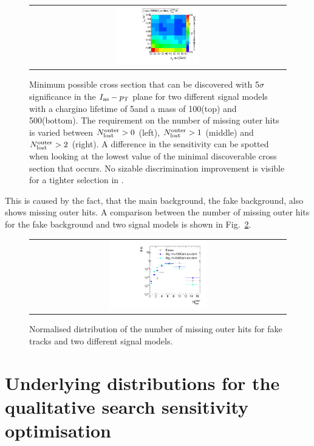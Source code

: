 \begin{figure}[!h]
\begin{tabular}{c}
    \includegraphics[width=0.33\textwidth]{figures/analysis/Optimisation/Madgraph_signal_mass_500_ctau_5cm_ECaloLe5_SOverDeltaBStatPlusSys_2.pdf} 
  \end{tabular}
  \caption{Minimum possible cross section that can be discovered with 5$\sigma$ significance in the $I_{\text{as}} - p_{\text{T}}$ plane for two different signal models with a chargino lifetime of 5\cm and a mass of 100\gev (top) and 500\gev (bottom).
           The requirement on the number of missing outer hits is varied between $N_{\text{lost}}^{\text{outer}}>0$ (left), $N_{\text{lost}}^{\text{outer}}>1$ (middle) and $N_{\text{lost}}^{\text{outer}}>2$ (right). 
           A difference in the sensitivity can be spotted when looking at the lowest value of the minimal discoverable cross section that occurs.
           No sizable discrimination improvement is visible for a tighter selection in \nlostouter.}
  \label{fig:optimisationNLostOuter}
\end{figure} 
This is caused by the fact, that the main background, the fake background, also shows missing outer hits.
A comparison between the number of missing outer hits for the fake background and two signal models is shown in Fig.~\ref{fig:NLostOuterFakeSignal}.
\begin{figure}[!h]
  \centering 
  \begin{tabular}{c}
    \includegraphics[width=0.39\textwidth]{figures/analysis/Optimisation/NLostOuterForFakes_chiTracksfullSelectionNoQCDCutsNoTrigger.pdf} 
  \end{tabular}
  \caption{Normalised distribution of the number of missing outer hits for fake tracks and two different signal models. }
  \label{fig:NLostOuterFakeSignal}
\end{figure} 

\FloatBarrier
\section{Underlying distributions for the qualitative search sensitivity optimisation}
\label{app:OptimisationApp}

